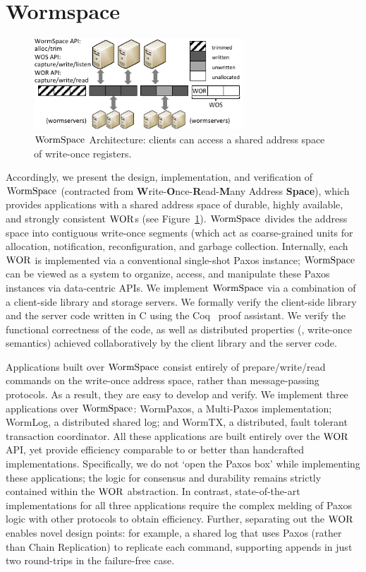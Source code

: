 \section{Wormspace}
\label{chapter:wormspace:sec:wormspace}

\begin{figure}
\centering
\includegraphics[width=0.7\textwidth, page=1]{figs/multipaxos/pics-small.pdf}
\caption{$\mathrm{WormSpace}$ Architecture: clients can access a shared address space of write-once registers.}
\label{fig:chapter:multipaxos:overview}
\end{figure}

Accordingly, we present the design, implementation, and verification of $\mathrm{WormSpace}$ (contracted from \textbf{W}rite-\textbf{O}nce-\textbf{R}ead-\textbf{M}any Address \textbf{Space}), which provides applications with a shared address space of durable, highly available, and strongly consistent $\mathrm{WOR}$s (see Figure~\ref{fig:chapter:multipaxos:overview}). $\mathrm{WormSpace}$ divides the address space into contiguous write-once segments (which act as coarse-grained units for allocation, notification, reconfiguration, and garbage collection. Internally, each $\mathrm{WOR}$ is implemented via a conventional single-shot Paxos instance; $\mathrm{WormSpace}$ can be viewed as a system to organize, access, and manipulate these Paxos instances via data-centric APIs. We implement $\mathrm{WormSpace}$ via a combination of a client-side library and storage servers. We formally verify the client-side library and the server code written in C using the Coq~\cite{coq} proof assistant. We verify the functional correctness of the code, as well as distributed properties (\eg, write-once semantics) achieved collaboratively by the client library and the server code.

Applications built over $\mathrm{WormSpace}$ consist entirely of prepare/write/read commands on the write-once address space, rather than message-passing protocols. As a result, they are easy to develop and verify. We implement three applications over $\mathrm{WormSpace}$: WormPaxos, a Multi-Paxos implementation; WormLog, a distributed shared log; and WormTX, a distributed, fault tolerant transaction coordinator. All these applications are built entirely over the $\mathrm{WOR}$ API, yet provide efficiency comparable to or better than handcrafted implementations. Specifically, we do not `open the Paxos box' while implementing these applications; the logic for consensus and durability remains strictly contained within the $\mathrm{WOR}$ abstraction. In contrast, state-of-the-art implementations for all three applications require the complex melding of Paxos logic with other protocols to obtain efficiency. Further, separating out the $\mathrm{WOR}$ enables novel design points: for example, a shared log that uses Paxos (rather than Chain Replication) to replicate each command, supporting appends in just two round-trips in the failure-free case.

